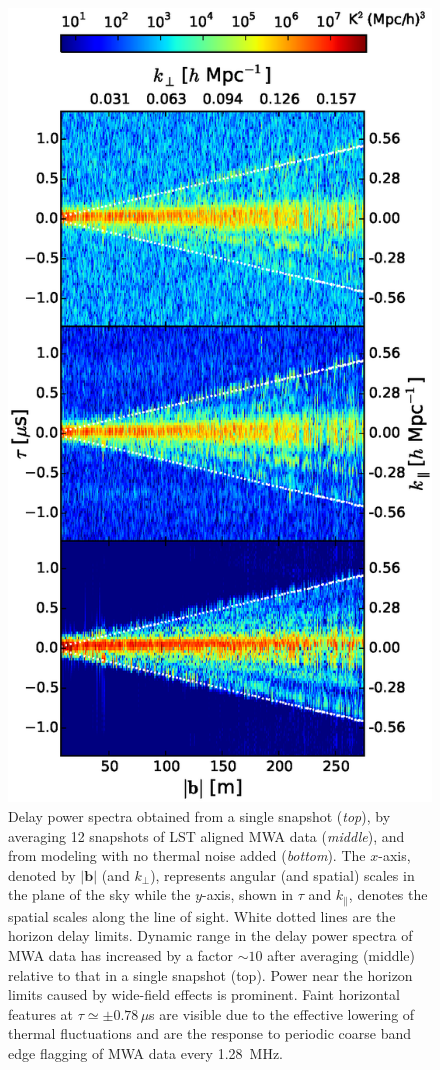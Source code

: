 \documentclass[preprint2,apjl,numberedappendix,twocolappendix,appendixfloats]{emulateapj}
\begin{document}
\begin{figure}[htb]
\centering
\includegraphics[width=\linewidth]{f1.eps}
\caption{Delay power spectra obtained from a single snapshot ({\it top}), by averaging 12 snapshots of LST aligned MWA data ({\it middle}), and from modeling with no thermal noise added ({\it bottom}). The $x$-axis, denoted by $|\boldsymbol{b}|$ (and $k_\perp$), represents angular (and spatial) scales in the plane of the sky while the $y$-axis, shown in $\tau$ and $k_\parallel$, denotes the spatial scales along the line of sight. White dotted lines are the horizon delay limits. Dynamic range in the delay power spectra of MWA data has increased by a factor $\sim 10$ after averaging (middle) relative to that in a single snapshot (top). Power near the horizon limits caused by wide-field effects is prominent. Faint horizontal features at $\tau\simeq\pm 0.78\,\mu$s are visible due to the effective lowering of thermal fluctuations and are the response to periodic coarse band edge flagging of MWA data every 1.28~MHz. \label{fig:delay-spectra}}

\end{figure}
\end{document}
